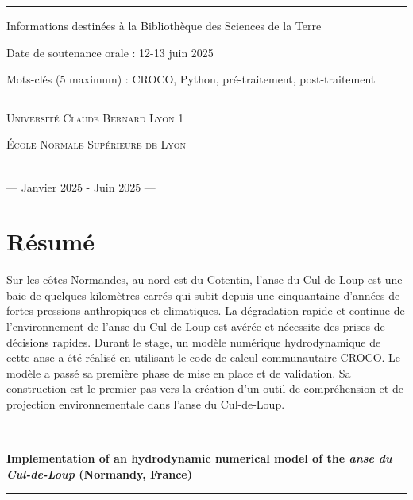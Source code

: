 \documentclass[10pt,a4paper,titlepage]{article}
\newcommand{\HRule}{\rule{\linewidth}{0.5mm}}
\begin{document}
\begin{titlepage}
\begin{sffamily}
\begin{center}
\HRule \vspace{0.2cm}
Informations destinées à la Bibliothèque des Sciences de la Terre

Date de soutenance orale : 12-13 juin 2025

Mots-clés (5 maximum) : CROCO, Python, pré-traitement, post-traitement
\HRule \vspace{0.2cm}
                \begin{minipage}{0.45\textwidth}
                    \begin{flushleft}
                        \textsc{Université Claude Bernard Lyon 1}
                    \end{flushleft}
                \end{minipage}
                \begin{minipage}{0.45\textwidth}
                    \begin{flushright}
                        \textsc{École Normale Supérieure de Lyon}
                    \end{flushright}
                \end{minipage}
                \\
                \vspace{1cm}
                {\large— Janvier 2025 - Juin 2025 —}

            \end{center}
        \end{sffamily}
    \end{titlepage}
\newpage

\section*{Résumé}
Sur les côtes Normandes, au nord-est du Cotentin, l'anse du Cul-de-Loup est une baie de quelques kilomètres carrés qui subit depuis une cinquantaine d'années de fortes pressions anthropiques et climatiques.
La dégradation rapide et continue de l'environnement de l'anse du Cul-de-Loup est avérée et nécessite des prises de décisions rapides.
Durant le stage, un modèle numérique hydrodynamique de cette anse a été réalisé en utilisant le code de calcul communautaire CROCO.
Le modèle a passé sa première phase de mise en place et de validation.
Sa construction est le premier pas vers la création d'un outil de compréhension et de projection environnementale dans l'anse du Cul-de-Loup.


\vspace{10cm}
\begin{sffamily}
\begin{center}
\HRule \\[0.4cm]
{ \huge \bfseries Implementation of an hydrodynamic numerical model of the \textit{anse du Cul-de-Loup} (Normandy, France)\\ [0.4cm] }

\HRule \\[2cm]
\end{center}
\end{sffamily}
\vspace{0.5cm}
\end{document}
